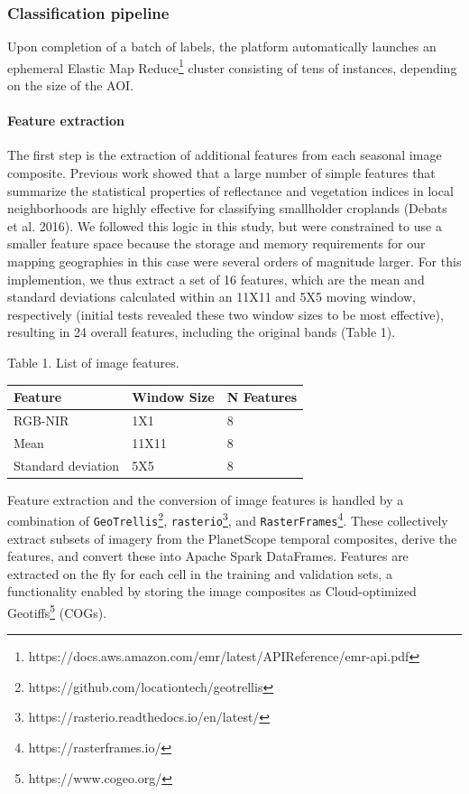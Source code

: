 \documentclass[11pt,a4paper]{article}
\begin{document}
\hypertarget{classification-pipeline}{%
\subsubsection{Classification pipeline}\label{classification-pipeline}}

Upon completion of a batch of labels, the platform automatically
launches an ephemeral Elastic Map
Reduce\footnote{https://docs.aws.amazon.com/emr/latest/APIReference/emr-api.pdf}
cluster consisting of tens of instances, depending on the size of the
AOI.

\hypertarget{feature-extraction}{%
\paragraph{Feature extraction}\label{feature-extraction}}

The first step is the extraction of additional features from each
seasonal image composite. Previous work showed that a large number of
simple features that summarize the statistical properties of reflectance
and vegetation indices in local neighborhoods are highly effective for
classifying smallholder croplands (Debats et al. 2016). We followed this
logic in this study, but were constrained to use a smaller feature space
because the storage and memory requirements for our mapping geographies
in this case were several orders of magnitude larger. For this
implemention, we thus extract a set of 16 features, which are the mean
and standard deviations calculated within an 11X11 and 5X5 moving
window, respectively (initial tests revealed these two window sizes to
be most effective), resulting in 24 overall features, including the
original bands (Table 1).

\begin{center}Table 1. List of image features.\end{center}

\begin{longtable}[]{@{}lll@{}}
\toprule
Feature & Window Size & N Features \\
\midrule
\endhead
RGB-NIR & 1X1 & 8 \\
Mean & 11X11 & 8 \\
Standard deviation & 5X5 & 8 \\
\bottomrule
\end{longtable}

Feature extraction and the conversion of image features is handled by a
combination of
\texttt{GeoTrellis}\footnote{https://github.com/locationtech/geotrellis},
\texttt{rasterio}\footnote{https://rasterio.readthedocs.io/en/latest/},
and \texttt{RasterFrames}\footnote{https://rasterframes.io/}. These
collectively extract subsets of imagery from the PlanetScope temporal
composites, derive the features, and convert these into Apache Spark
DataFrames. Features are extracted on the fly for each cell in the
training and validation sets, a functionality enabled by storing the
image composites as Cloud-optimized
Geotiffs\footnote{https://www.cogeo.org/} (COGs).
\end{document}
